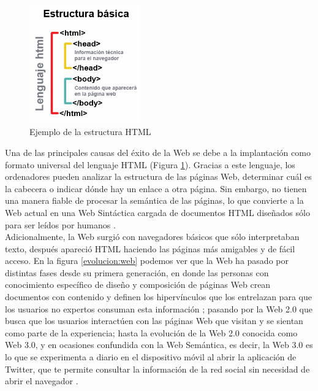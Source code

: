 \begin{figure}[H]
	\centering
	\includegraphics[height=5.1cm]{imagenes/capitulo3/estructurabasica} 
	\caption{Ejemplo de la estructura HTML \cite{imagen-html}}
	\label{html}
\end{figure}

Una de las principales causas del éxito de la Web se debe a la implantación como formato universal del lenguaje HTML (Figura \ref{html}). Gracias a este lenguaje, los ordenadores pueden analizar la estructura de las páginas Web, determinar cuál es la cabecera o indicar dónde hay un enlace a otra página. Sin embargo, no tienen una manera fiable de procesar la semántica de las páginas, lo que convierte a la Web actual en una Web Sintáctica cargada de documentos HTML diseñados sólo para ser leídos por humanos \cite{apuntes-clase-jose}.\\

Adicionalmente, la Web surgió con navegadores básicos que sólo interpretaban texto, después apareció HTML haciendo las páginas más amigables y de fácil acceso. En la figura \ref{evolucion:web} podemos ver que la Web ha pasado por distintas fases desde su primera generación, en donde las personas con conocimiento específico de diseño y composición de páginas Web crean documentos con contenido y definen los hipervínculos que los entrelazan para que los usuarios no expertos consuman esta información \cite{cwb}; pasando por la  Web 2.0 que busca que los usuarios interactúen con las páginas Web que visitan y se sientan como parte de la experiencia; hasta la evolución de la Web 2.0 conocida como Web 3.0, y en ocasiones confundida con la Web Semántica, es decir, la Web 3.0 es lo que se experimenta a diario en el dispositivo móvil al abrir la aplicación de Twitter, que te permite consultar la información de la red social sin necesidad de abrir el navegador \cite{web-nueva}.

